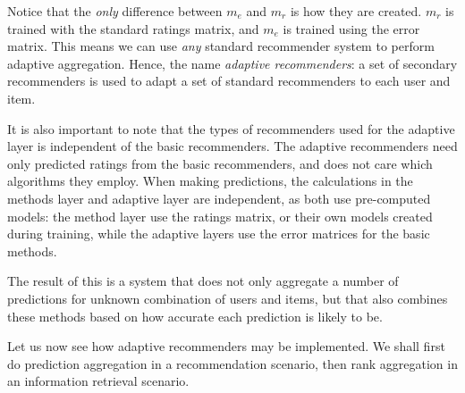 Notice that the \emph{only} difference between $m_e$ and $m_r$ is how they are created.
$m_r$ is trained with the standard ratings matrix, and $m_e$ is trained using the error matrix.
This means we can use \emph{any} standard recommender system to perform adaptive aggregation.
Hence, the name \emph{adaptive recommenders}:
a set of secondary recommenders is used to adapt a set of standard
recommenders to each user and item.

It is also important to note that the types of recommenders used for the adaptive layer
is independent of the basic recommenders.
The adaptive recommenders need only predicted ratings from the basic recommenders, and does not care which algorithms they employ.
When making predictions, the calculations in the methods layer and adaptive layer
are independent, as both use pre-computed models:
the method layer use the ratings matrix, or their own models
created during training, while the adaptive layers use the error matrices for the
basic methods.

The result of this is a system that does not only aggregate a number of predictions for unknown
combination of users and items,
but that also combines these methods based on how accurate each prediction is likely to be.

Let us now see how adaptive recommenders may be implemented.
We shall first do prediction aggregation in a recommendation scenario,
then rank aggregation in an information retrieval scenario.

